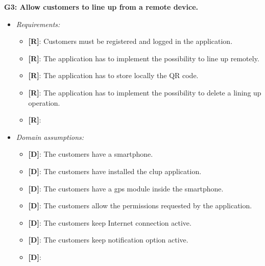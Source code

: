 \textbf{G3: Allow customers to line up from a remote device.}
\begin{itemize}
\item \textit{Requirements:}
\begin{itemize}
	\item {\textbf{[R]}}: Customers must be registered and logged in the application.
	\item {\textbf{[R]}}: The application has to implement the possibility to line up remotely.
	\item {\textbf{[R]}}: The application has to store locally the QR code.
	\item {\textbf{[R]}}: The application has to implement the possibility to delete a lining up operation.
	\item {\textbf{[R]}}:
\end{itemize}

\item \textit{Domain assumptions:}
\begin{itemize}
	\item {\textbf{[D]}}: The customers have a smartphone.
	\item {\textbf{[D]}}: The customers have installed the \gls{clup} application.
	\item {\textbf{[D]}}: The customers have a \gls{gps} module inside the smartphone.
	\item {\textbf{[D]}}: The customers allow the permissions requested by the application.
	\item {\textbf{[D]}}: The customers keep Internet connection active.
	\item {\textbf{[D]}}: The customers keep notification option active.
	\item {\textbf{[D]}}:
\end{itemize}
\end{itemize}

